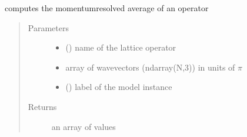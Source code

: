 \documentclass[letterpaper,10pt,english]{sphinxmanual}
\begin{document}
\begin{fulllineitems}
\label{\detokenize{functions:pyqcm.momentum_profile}}
\sphinxAtStartPar
computes the momentum\sphinxhyphen{}resolved average of an operator
\begin{quote}\begin{description}
\item[{Parameters}] \leavevmode\begin{itemize}
\item {} 
\sphinxAtStartPar
{} () \textendash{} name of the lattice operator

\item {} 
\sphinxAtStartPar
{} \textendash{} array of wavevectors (ndarray(N,3)) in units of \(\pi\)

\item {} 
\sphinxAtStartPar
{} () \textendash{} label of the model instance

\end{itemize}

\item[{Returns}] \leavevmode
\sphinxAtStartPar
an array of values

\end{description}\end{quote}

\end{fulllineitems}

\end{document}
